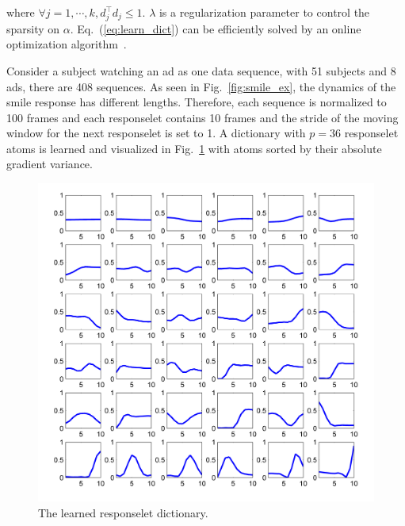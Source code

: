 \documentclass[twoside,leqno,twocolumn]{article}
\begin{document}
\noindent where $\forall j=1,\cdots,k, d^\top_j d_j \leq 1$. $\lambda$ is a regularization parameter to control the sparsity on $\alpha$. Eq.~(\ref{eq:learn_dict}) can be efficiently solved by an online optimization algorithm~\cite{spams}. 

Consider a subject watching an ad as one data sequence, with 51 subjects and 8 ads, there are 408 sequences. As seen in Fig.~\ref{fig:smile_ex}, the dynamics of the smile response has different lengths. Therefore, each sequence is normalized to 100 frames and each responselet contains 10 frames and the stride of the moving window for the next responselet is set to 1. A dictionary with $p=36$ responselet atoms is learned and visualized in Fig.~\ref{fig:dict} with atoms sorted by their absolute gradient variance. 

\begin{figure}[h]
	\centering
		\includegraphics[width=1\columnwidth]{fig/dict.png}
	\caption{The learned responselet dictionary.}
	\label{fig:dict}
\end{figure}
\end{document}
